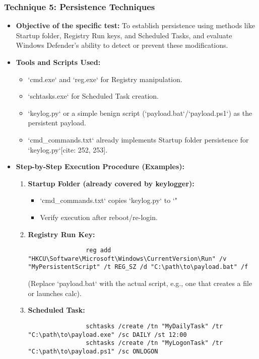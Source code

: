 \documentclass[11pt]{article}
\begin{document}
	\subsubsection{Technique 5: Persistence Techniques}
	\begin{itemize}
		\item \textbf{Objective of the specific test:} To establish persistence using methods like Startup folder, Registry Run keys, and Scheduled Tasks, and evaluate Windows Defender's ability to detect or prevent these modifications.
		\item \textbf{Tools and Scripts Used:}
		\begin{itemize}
			\item `cmd.exe` and `reg.exe` for Registry manipulation.
			\item `schtasks.exe` for Scheduled Task creation.
			\item `keylog.py` or a simple benign script (`payload.bat`/`payload.ps1`) as the persistent payload.
			\item `cmd\_commands.txt` already implements Startup folder persistence for `keylog.py`[cite: 252, 253].
		\end{itemize}
		\item \textbf{Step-by-Step Execution Procedure (Examples):}
		\begin{enumerate}
			\item \textbf{Startup Folder (already covered by keylogger):}
			\begin{itemize}
				\item `cmd\_commands.txt` copies `keylog.py` to `"%
				\item Verify execution after reboot/re-login.
			\end{itemize}
			\item \textbf{Registry Run Key:}
			\begin{verbatim}
				reg add "HKCU\Software\Microsoft\Windows\CurrentVersion\Run" /v "MyPersistentScript" /t REG_SZ /d "C:\path\to\payload.bat" /f
			\end{verbatim}
			(Replace `payload.bat` with the actual script, e.g., one that creates a file or launches calc).
			\item \textbf{Scheduled Task:}
			\begin{verbatim}
				schtasks /create /tn "MyDailyTask" /tr "C:\path\to\payload.exe" /sc DAILY /st 12:00
				schtasks /create /tn "MyLogonTask" /tr "C:\path\to\payload.ps1" /sc ONLOGON
			\end{verbatim}

\end{enumerate}
\end{itemize}
\end{document}
